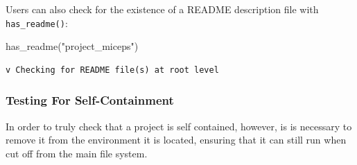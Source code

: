 \documentclass[12pt,twoside]{reedthesis}
\newenvironment{Shaded}{\begin{snugshade}}{\end{snugshade}}
\newcommand{\FunctionTok}[1]{\textcolor[rgb]{0.00,0.00,0.00}{#1}}
\newcommand{\NormalTok}[1]{#1}
\newcommand{\StringTok}[1]{\textcolor[rgb]{0.31,0.60,0.02}{#1}}
\begin{document}
Users can also check for the existence of a README description file with \texttt{has\_readme()}:
\begin{Shaded}
\begin{Highlighting}[]
\FunctionTok{has\_readme}\NormalTok{(}\StringTok{"project\_miceps"}\NormalTok{)}
\end{Highlighting}
\end{Shaded}
\begin{verbatim}
v Checking for README file(s) at root level
\end{verbatim}
\hypertarget{testing-for-self-containment}{%
\subsubsection{Testing For Self-Containment}\label{testing-for-self-containment}}

In order to truly check that a project is self contained, however, is is necessary to remove it from the environment it is located, ensuring that it can still run when cut off from the main file system.
\end{document}
